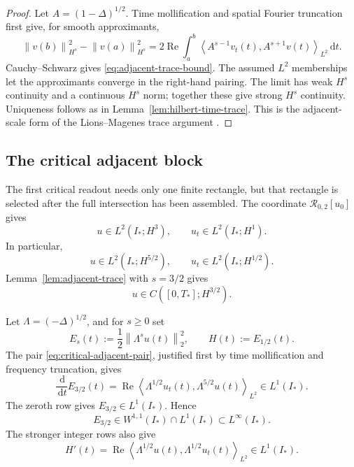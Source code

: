 \documentclass[11pt,letterpaper]{article}
\theoremstyle{definition}
\theoremstyle{remark}
\newcommand{\cR}{\mathcal R}
\newcommand{\norm}[1]{\left\lVert #1\right\rVert}
\newcommand{\dd}{\,\mathrm d}
\newcommand{\Istar}{I_*}
\newcommand{\pair}[2]{\left\langle #1,#2\right\rangle}
\begin{document}
\begin{proof}
Let \(A=(1-\Delta)^{1/2}\).  Time mollification and spatial Fourier
truncation first give, for smooth approximants,
\[
\norm{v(b)}_{H^s}^{2}-\norm{v(a)}_{H^s}^{2}
=2\operatorname{Re}\int_a^b
\pair{A^{s-1}v_t(t)}{A^{s+1}v(t)}_{L^2}\dd t.
\]
Cauchy--Schwarz gives \eqref{eq:adjacent-trace-bound}.  The assumed
\(L^2\) memberships let the approximants converge in the right-hand
pairing.  The limit has weak \(H^s\) continuity and a continuous \(H^s\)
norm; together these give strong \(H^s\) continuity.  Uniqueness follows
as in Lemma~\ref{lem:hilbert-time-trace}.  This is the adjacent-scale form
of the Lions--Magenes trace argument \cite{LionsMagenes1972}.
\end{proof}

\subsection{The critical adjacent block}

The first critical readout needs only one finite rectangle, but that
rectangle is selected after the full intersection has been assembled.
The coordinate \(\cR_{0,2}[u_0]\) gives
\[
u\in L^2(\Istar;H^3),
\qquad
u_t\in L^2(\Istar;H^1).
\]
In particular,
\begin{equation}
u\in L^2(\Istar;H^{5/2}),
\qquad
u_t\in L^2(\Istar;H^{1/2}).
\label{eq:critical-adjacent-pair}
\end{equation}
Lemma~\ref{lem:adjacent-trace} with \(s=3/2\) gives
\begin{equation}
u\in C([0,T_*];H^{3/2}).
\label{eq:critical-hthreehalf-trace}
\end{equation}

Let \(\Lambda=(-\Delta)^{1/2}\), and for \(s\ge0\) set
\[
E_s(t):=\frac12\norm{\Lambda^s u(t)}_2^2,
\qquad
H(t):=E_{1/2}(t).
\]
The pair \eqref{eq:critical-adjacent-pair}, justified first by time
mollification and frequency truncation, gives
\begin{equation}
\frac{\dd}{\dd t}E_{3/2}(t)
=\operatorname{Re}
\pair{\Lambda^{1/2}u_t(t)}{\Lambda^{5/2}u(t)}_{L^2}
\in L^1(\Istar).
\label{eq:ethreehalf-derivative}
\end{equation}
The zeroth row gives \(E_{3/2}\in L^1(\Istar)\).  Hence
\begin{equation}
E_{3/2}\in W^{1,1}(\Istar)\cap L^1(\Istar)
\subset L^\infty(\Istar).
\label{eq:ethreehalf-control}
\end{equation}
The stronger integer rows also give
\begin{equation}
H'(t)
=\operatorname{Re}
\pair{\Lambda^{1/2}u(t)}{\Lambda^{1/2}u_t(t)}_{L^2}
\in L^1(\Istar).
\label{eq:height-derivative}
\end{equation}
\end{document}
